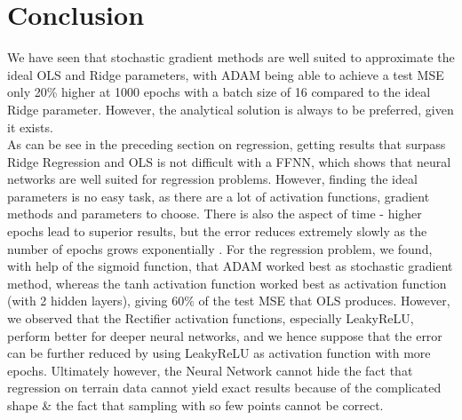 \documentclass[11pt,a4paper,titlepage]{article}
\begin{document}
\section{Conclusion}
We have seen that stochastic gradient methods are well suited to approximate the ideal OLS and Ridge parameters, with ADAM being able to achieve a test MSE only 20\% higher at 1000 epochs with a batch size of 16 compared to the ideal Ridge parameter. However, the analytical solution is always to be preferred, given it exists. \\ 
As can be see in the preceding section on regression, getting results that surpass Ridge Regression and OLS is not difficult with a FFNN, which shows that neural networks are well suited for regression problems. However, finding the ideal parameters is no easy task, as there are a lot of activation functions, gradient methods and parameters to choose. There is also the aspect of time - higher epochs lead to superior results, but the error reduces extremely slowly as the number of epochs grows exponentially \citep{handsOnMachineLearning}. For the regression problem, we found, with help of the sigmoid function, that ADAM worked best as stochastic gradient method, whereas the tanh activation function worked best as activation function (with 2 hidden layers), giving $60\%$ of the test MSE that OLS produces. However, we observed that the Rectifier activation functions, especially LeakyReLU, perform better for deeper neural networks, and we hence suppose that the error can be further reduced by using LeakyReLU as activation function with more epochs. Ultimately however, the Neural Network cannot hide the fact that regression on terrain data cannot yield exact results because of the complicated shape \& the fact that sampling with so few points cannot be correct. \\\\
\end{document}
